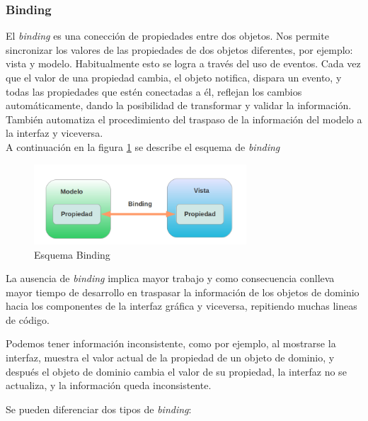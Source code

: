 

\subsubsection{Binding}
\label{binding}

	El \emph{binding} es una conección de propiedades entre dos objetos. 
	Nos permite sincronizar los valores de las propiedades de dos objetos
	diferentes, por ejemplo: vista y modelo. Habitualmente esto se logra a través
	del uso de eventos.
	Cada vez que el valor de una propiedad cambia, el objeto notifica, dispara un
	evento, y todas las propiedades que estén conectadas a él,
	reflejan los cambios automáticamente, dando la posibilidad de transformar y
	validar la información.\\
	También automatiza el procedimiento del traspaso de la información del
	modelo a la interfaz y viceversa.\\
	
	A continuación en la figura \ref{binding} se describe el esquema de
		\emph{binding}
		
		\begin{figure}[h]
			\centering
			\includegraphics[width=300px]{img/binding}
			\caption{Esquema Binding}
			\label{binding}
		\end{figure}
		
		\bigskip
	
	La ausencia de \emph{binding} implica mayor trabajo  y como consecuencia
	conlleva mayor tiempo de desarrollo en  traspasar la información de los
	objetos de dominio hacia los componentes de la interfaz gráfica y viceversa, repitiendo muchas lineas de código.
	
	Podemos tener información inconsistente, como por ejemplo, al mostrarse la interfaz,
	muestra el valor actual de la propiedad de un objeto de dominio, y después el
	objeto de dominio cambia el valor de su propiedad, la interfaz no se actualiza,
	y la información queda inconsistente.
	
	\bigskip
	
	Se pueden diferenciar dos tipos de \emph{binding}:
	
